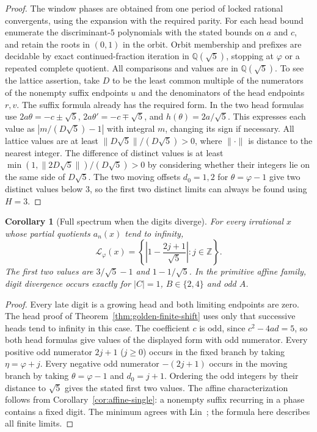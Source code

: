 \documentclass[11pt]{amsart}
\newtheorem{corollary}[theorem]{Corollary}
\theoremstyle{definition}
\theoremstyle{remark}
\numberwithin{equation}{section}
\newcommand{\Q}{\mathbb{Q}}
\newcommand{\Z}{\mathbb{Z}}
\begin{document}
\begin{proof}
The window phases are obtained from one period of locked rational
convergents, using the expansion with the required parity.
For each head bound enumerate the discriminant-$5$ polynomials
with the stated bounds on $a$ and $c$, and retain the roots in
$(0,1)$ in the orbit. Orbit membership and prefixes are decidable by
exact continued-fraction iteration in $\Q(\sqrt5)$, stopping at
$\varphi$ or a repeated complete quotient. All comparisons and
values are in $\Q(\sqrt5)$. To see the lattice assertion, take $D$ to
be the least common multiple of the numerators of the nonempty
suffix endpoints $u$ and the denominators of the head endpoints $r,v$.
The suffix formula already has the required form. In the two head
formulas use $2a\theta=-c\pm\sqrt5$, $2a\theta'=-c\mp\sqrt5$, and
$h(\theta)=2a/\sqrt5$. This expresses each value as
$|m/(D\sqrt5)-1|$ with integral $m$, changing its sign if necessary.
All lattice values are at least
$\|D\sqrt5\|/(D\sqrt5)>0$, where $\|\cdot\|$ is distance to the
nearest integer. The difference of distinct values is at least
$\min(1,\|2D\sqrt5\|)/(D\sqrt5)>0$ by considering whether their
integers lie on the same side of $D\sqrt5$. The two moving offsets $d_0=1,2$
for $\theta=\varphi-1$ give two distinct values below $3$,
so the first two distinct limits can always be found using $H=3$.
\end{proof}

\begin{corollary}[Full spectrum when the digits diverge]\label{cor:golden-pure-heads}
For every irrational $x$ whose partial quotients $a_n(x)$ tend to
infinity,
\[
 \mathcal L_\varphi(x)=
 \left\{\left|1-\frac{2j+1}{\sqrt5}\right|:j\in\Z\right\}.
\]
The first two values are $3/\sqrt5-1$ and $1-1/\sqrt5$.
In the primitive affine family, digit divergence occurs exactly for
$|C|=1$, $B\in\{2,4\}$ and odd $A$.
\end{corollary}

\begin{proof}
Every late digit is a growing head and both limiting endpoints
are zero. The head proof of Theorem~\ref{thm:golden-finite-shift}
uses only that successive heads tend to infinity in this case.
The coefficient $c$ is odd, since $c^2-4ad=5$, so both head
formulas give values of the displayed form with odd numerator.
Every positive odd numerator $2j+1$ ($j\ge0$) occurs in the fixed
branch by taking $\eta=\varphi+j$. Every negative odd numerator
$-(2j+1)$ occurs in the moving branch by taking
$\theta=\varphi-1$ and $d_0=j+1$. Ordering the odd integers by
their distance to $\sqrt5$ gives the stated first two values.
The affine characterization follows from Corollary~\ref{cor:affine-single}:
a nonempty suffix recurring in a phase contains a fixed digit.
The minimum agrees with Lin~\cite[Lemma~4.2]{Lin2018}; the formula
here describes all finite limits.
\end{proof}
\end{document}
